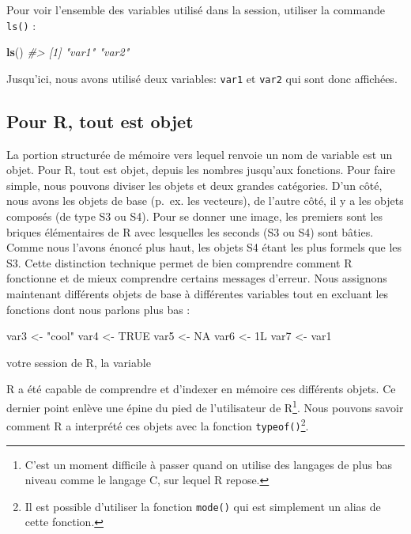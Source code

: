 \documentclass[]{article}
\newenvironment{Shaded}{\begin{snugshade}}{\end{snugshade}}
\newcommand{\CommentTok}[1]{\textcolor[rgb]{0.56,0.35,0.01}{\textit{#1}}}
\newcommand{\KeywordTok}[1]{\textcolor[rgb]{0.13,0.29,0.53}{\textbf{#1}}}
\newcommand{\NormalTok}[1]{#1}
\newcommand{\OtherTok}[1]{\textcolor[rgb]{0.56,0.35,0.01}{#1}}
\newcommand{\StringTok}[1]{\textcolor[rgb]{0.31,0.60,0.02}{#1}}
\begin{document}
Pour voir l'ensemble des variables utilisé dans la session, utiliser la commande
\texttt{ls()} :

\begin{Shaded}
\begin{Highlighting}[]
\KeywordTok{ls}\NormalTok{()}
\CommentTok{#> [1] "var1" "var2"}
\end{Highlighting}
\end{Shaded}

Jusqu'ici, nous avons utilisé deux variables: \texttt{var1} et \texttt{var2} qui sont donc
affichées.

\hypertarget{pour-r-tout-est-objet}{%
\subsection{Pour R, tout est objet}\label{pour-r-tout-est-objet}}

La portion structurée de mémoire vers lequel renvoie un nom de variable est un
objet. Pour R, tout est objet, depuis les nombres jusqu'aux fonctions. Pour faire simple, nous pouvons diviser les objets et deux grandes catégories. D'un côté, nous avons les objets de base (p.~ex. les vecteurs), de l'autre côté, il y a les objets composés (de type S3 ou S4). Pour se donner une image, les premiers sont les briques élémentaires de R avec lesquelles les seconds (S3 ou S4) sont bâties. Comme nous l'avons énoncé plus haut, les objets S4 étant les plus formels que les S3. Cette distinction technique permet de bien comprendre comment R fonctionne et de mieux comprendre certains messages d'erreur. Nous assignons maintenant différents objets de base à différentes variables tout en excluant les fonctions dont nous parlons plus bas :

\begin{Shaded}
\begin{Highlighting}[]
\NormalTok{var3 <-}\StringTok{ "cool"}
\NormalTok{var4 <-}\StringTok{ }\OtherTok{TRUE}
\NormalTok{var5 <-}\StringTok{ }\OtherTok{NA}
\NormalTok{var6 <-}\StringTok{ }\NormalTok{1L}
\NormalTok{var7 <-}\StringTok{ }\NormalTok{var1}
\end{Highlighting}
\end{Shaded}

votre session de R, la variable

R a été capable de comprendre et d'indexer en mémoire ces différents objets. Ce dernier point enlève une épine du pied de l'utilisateur de R\footnote{C'est un moment difficile à passer quand on utilise des langages de plus bas niveau comme le langage C, sur lequel R repose.}. Nous pouvons savoir comment R a interprété ces objets avec la fonction \texttt{typeof()}\footnote{Il est possible d'utiliser la fonction \texttt{mode()} qui est simplement un alias de cette fonction.}.
\end{document}
